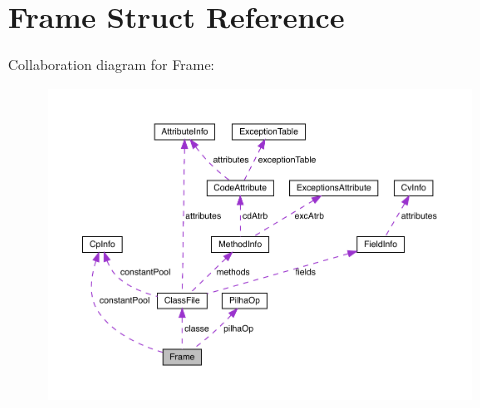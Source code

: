 \hypertarget{structFrame}{}\section{Frame Struct Reference}
\label{structFrame}


Collaboration diagram for Frame\+:
\nopagebreak
\begin{figure}[H]
\begin{center}
\leavevmode
\includegraphics[width=350pt]{structFrame__coll__graph}
\end{center}
\end{figure}
